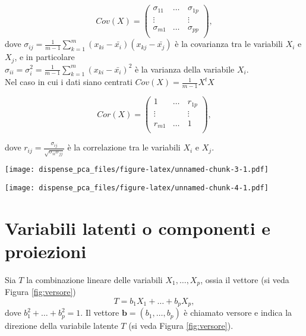 \documentclass[
  11pt,
]{book}
\begin{document}
\begin{equation}\label{eq:Cov}
Cov(X)=\left(
\begin{array}{cccc}
\sigma_{11}  & \dots & \sigma_{1p} \\
\vdots & \quad & \vdots \\
\sigma_{m1} & \dots & \sigma_{pp} \\
\end{array}
\right),
\end{equation}
dove \(\sigma_{ij}=\frac{1}{m-1}\sum_{k=1}^m(x_{ki}-\bar{x_i})(x_{kj}-\bar{x_j})\) è la covarianza tra
le variabili \(X_i\) e \(X_j\),
e in particolare\\
\(\sigma_{ii}=\sigma_i^2=\frac{1}{m-1}\sum_{k=1}^m(x_{ki}-\bar{x_i})^2\) è la varianza della variabile
\(X_i\).\\
Nel caso in cui i dati siano centrati \(Cov(X)=\frac{1}{m-1}X^tX\)

\begin{equation}\label{eq:Corr}
Cor(X)=\left(
\begin{array}{cccc}
1  & \dots & r_{1p} \\
\vdots & \quad & \vdots \\
r_{m1} & \dots & 1\\
\end{array}
\right),
\end{equation}

dove \(r_{ij}=\frac{\sigma_{ij}}{\sqrt{\sigma_{ii}\sigma_{jj}}}\) è la correlazione tra
le variabili \(X_i\) e \(X_j\).

\texttt{[image: dispense\_pca\_files/figure-latex/unnamed-chunk-3-1.pdf]}

\texttt{[image: dispense\_pca\_files/figure-latex/unnamed-chunk-4-1.pdf]}

\hypertarget{variabili-latenti-o-componenti-e-proiezioni}{%
\section{\texorpdfstring{Variabili latenti o componenti e proiezioni \label{par:VariabiliLatenti}}{Variabili latenti o componenti e proiezioni }}\label{variabili-latenti-o-componenti-e-proiezioni}}

Sia \(T\) la combinazione lineare delle variabili \(X_1,\dots,X_p\), ossia il vettore
(si veda Figura \ref{fig:versore})
\begin{equation}
T=b_1X_1+\dots+b_pX_p,
\end{equation}
dove \(b_1^2+\dots+b_p^2=1\). Il vettore \(\textbf{b}=(b_1,\dots,b_p)\) è chiamato versore
e indica la direzione della variabile latente \(T\) (si veda Figura \ref{fig:versore}).
\end{document}
